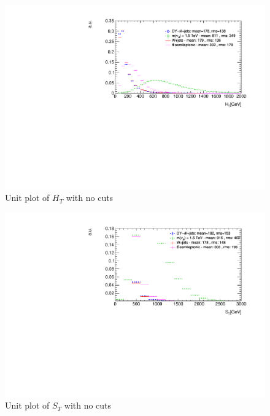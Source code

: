 \documentclass[12pt]{article}
\begin{document}
\begin{figure}[H]
\centering
\includegraphics[scale = 0.7]{Figures/HT_unitNoCuts}
\caption{Unit plot of $H_{T}$ with no cuts}
\label{fig: HTunitNC}
\end{figure}

\begin{figure}[H]
\centering
\includegraphics[scale = 0.7]{Figures/ST_unitNoCuts}
\caption{Unit plot of $S_{T}$ with no cuts}
\label{fig: STunitNC}
\end{figure}
\end{document}
